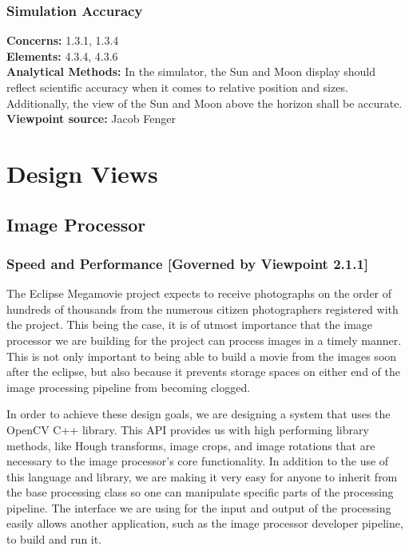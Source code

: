 \documentclass[10pt, onecolumn, draftclsnofoot, letterpaper, compsoc]{IEEEtran}
\begin{document}
  \subsubsection{Simulation Accuracy}
  \textbf{Concerns:} 1.3.1, 1.3.4 \\
  \textbf{Elements:} 4.3.4, 4.3.6 \\
  \textbf{Analytical Methods:} In the simulator, the Sun and
  Moon display should reflect scientific accuracy when it
  comes to relative position and sizes. Additionally, the
  view of the Sun and Moon above the horizon shall be
  accurate.\\
  \textbf{Viewpoint source:} Jacob Fenger \\


\section{Design Views}

\subsection{Image Processor}

\subsubsection{Speed and Performance [Governed by Viewpoint 2.1.1]}

The Eclipse Megamovie project expects to receive photographs on the order of
hundreds of thousands from the numerous citizen photographers registered with
the project. This being the case, it is of utmost importance that the image
processor we are building for the project can process images in a timely manner.
This is not only important to being able to build a movie from the images soon
after the eclipse, but also because it prevents storage spaces on either end of
the image processing pipeline from becoming clogged.

In order to achieve these design goals, we are designing a system that uses the
OpenCV C++ library.  This API provides us with high performing library methods,
like Hough transforms, image crops, and image rotations that are necessary to
the image processor's core functionality. In addition to the use of this
language and library, we are making it very easy for anyone to inherit from
the base processing class so one can manipulate specific parts of the
processing pipeline. The interface we are using for the input and output of
the processing easily allows another application, such as the image processor
developer pipeline, to build and run it. \\
\end{document}
